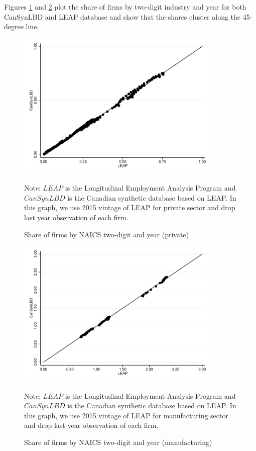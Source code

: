 \documentclass{article}
\begin{document}
Figures \ref{FirmSharePrivate} and \ref{FirmShareManufacturing} plot the share of firms by two-digit industry and year for both CanSynLBD and LEAP database
and show that the shares cluster along the 45-degree line.

\begin{figure} [H]
\centering
\caption{Share of firms by NAICS two-digit and year (private)} \label{FirmSharePrivate}
\includegraphics[height=2.8in, width=.7\linewidth]{graphs/Share_of_firms_by_NAICS_two-digit_and_year_private_bw.pdf} 
\begin{minipage}{0.85\textwidth}
{\footnotesize Note: $LEAP$ is the Longitudinal Employment Analysis Program and $CanSynLBD$ is the Canadian synthetic database based on LEAP. In this graph, we use 2015 vintage of LEAP for private sector and drop last year observation of each firm. \par}
\end{minipage}
\end{figure}


\vspace{-15.5pt}
\begin{figure} [H]
\centering
\caption{Share of firms by NAICS two-digit and year (manufacturing)} \label{FirmShareManufacturing}
\includegraphics[height=2.8in, width=.7\linewidth]{graphs/Share_of_firms_by_NAICS_two-digit_and_year_Manufacturing_bw.pdf} 
\begin{minipage}{0.85\textwidth}
{\footnotesize Note: $LEAP$ is the Longitudinal Employment Analysis Program and $CanSynLBD$ is the Canadian synthetic database based on LEAP. In this graph, we use 2015 vintage of LEAP for manufacturing sector and drop last year observation of each firm. \par}
\end{minipage}
\end{figure}
\end{document}
